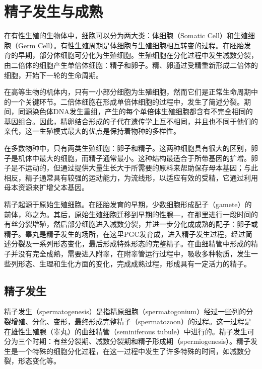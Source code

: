 \chapter{精子发生与成熟}

在有性生殖的生物体中，细胞可以分为两大类：体细胞（Somatic Cell）和生殖细胞（Germ Cell）。有性生殖周期是体细胞与生殖细胞相互转变的过程。在胚胎发育的早期，部分体细胞可分化为生殖细胞。生殖细胞在分化过程中发生减数分裂，由二倍体的细胞产生单倍体细胞：精子和卵子。精、卵通过受精重新形成二倍体的细胞，开始下一轮的生命周期。

在高等生物的机体内，只有一小部分细胞为生殖细胞，然而它们是正常生命周期中的一个关键环节。二倍体细胞在形成单倍体细胞的过程中，发生了简述分裂。期间，同源染色体DNA发生重组，产生的每个单倍体生殖细胞都含有不完全相同的基因组合。因此，精卵结合形成的子代在遗传学上互不相同，并且也不同于他们的亲代，这一生殖模式最大的优点是保持着物种的多样性。

在多数物种中，只有两类生殖细胞：卵子和精子。这两种细胞具有很大的区别，卵子是机体中最大的细胞，而精子通常最小。这种结构最适合于所带基因的扩增。卵子是不运动的，但通过提供大量生长大于所需要的原料来帮助保存母本基因；与此相反，精子通常具有较强的运动能力，为流线形，以适应有效的受精，它通过利用母本资源来扩增父本基因。

精子起源于原始生殖细胞。在胚胎发育的早期，少数细胞形成配子（gamete）的前体，称之为。其后，原始生殖细胞迁移到早期的性腺---，在那里进行一段时间的有丝分裂增殖，然后部分细胞进入减数分裂，并进一步分化成成熟的配子：卵子或精子。睾丸是精子发生的场所，在这里PGC发育成，进入精子发生过程，经过简述分裂及一系列形态变化，最后形成特殊形态的完整精子。在曲细精管中形成的精子并没有完全成熟，需要进入附睾，在附睾管运行过程中，吸收多种物质，发生一些列形态、生理和生化方面的变化，完成成熟过程，形成具有一定活力的精子。

\section{精子发生}

精子发生（spermatogenesis）是指精原细胞（spermatogonium）经过一些列的分裂增殖、分化、变形，最终形成完整精子（spermatozoon）的过程。这一过程是在雄性生殖腺（睾丸）的曲细精管（seminiferous tubule）中进行的。精子发生可分为三个时期：有丝分裂期、减数分裂期和精子形成期（spermiogenesis）。精子发生是一个特殊的细胞分化过程，在这一过程中发生了许多特殊的时间，如减数分裂，形态变化等。


